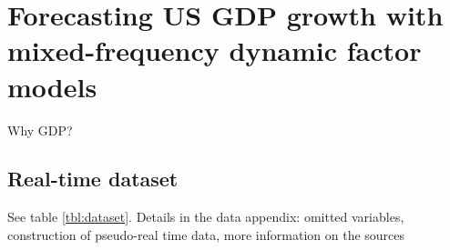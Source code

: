 \chapter{Forecasting US GDP growth with mixed-frequency dynamic factor models}\label{sec:experiment}

Why GDP?

\section{Real-time dataset}

See table \ref{tbl:dataset}. Details in the data appendix: omitted variables, construction of pseudo-real time data, more information on the sources






